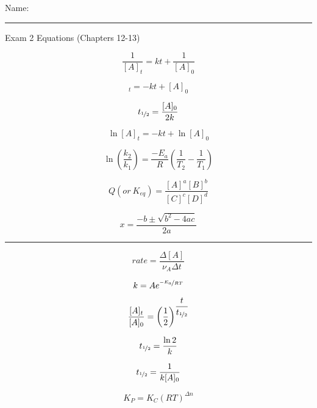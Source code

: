 \documentclass[11pt, letterpaper]{memoir}
\begin{document}
  {\large Name: \rule[-1mm]{4in}{.1pt}}

	\begin{center}
		{\large Exam 2 Equations (Chapters 12-13)}
	\end{center}

  \begin{minipage}[c][\stretch{1}][c]{0.46\linewidth}
    \begin{equation*}
      \dfrac{1}{[A]_t} = kt + \dfrac{1}{[A]_0}
    \end{equation*}

    \begin{equation*}
      [A]_t=-kt+[A]_0
    \end{equation*}

    \begin{equation*}
      t_{\nicefrac{1}{2}} = \dfrac{[A]_0}{2k}
    \end{equation*}

    \begin{equation*}
      \ln[A]_t=-kt+\ln[A]_0
    \end{equation*}

    \begin{equation*}
      \ln\left(\dfrac{k_2}{k_1}\right)=\dfrac{-E_a}{R}\left(\dfrac{1}{T_2}-\dfrac{1}{T_1}\right)
    \end{equation*}

    \begin{equation*}
      Q \left(or~K_{eq}\right) = \dfrac{[A]^a[B]^b}{[C]^c[D]^d}
    \end{equation*}

    \begin{equation*}
      x=\dfrac{-b\pm\sqrt{b^2-4ac}}{2a}
    \end{equation*}
  \end{minipage}
  \rule[-400pt]{1.5pt}{600pt}
  \begin{minipage}[c][\stretch{1}][c]{0.5\linewidth}
    \begin{equation*}
      rate=\dfrac{\Delta[A]}{\nu_A\Delta t}
    \end{equation*}

    \begin{equation*}
      k=Ae^{\nicefrac{-E_a}{RT}}
    \end{equation*}

    \begin{equation*}
      \dfrac{[A]_t}{[A]_0}=\left(\dfrac{1}{2}\right)^{\dfrac{t}{t_{\nicefrac{1}{2}}}}
    \end{equation*}

    \begin{equation*}
      t_{\nicefrac{1}{2}}=\dfrac{\ln{2}}{k}
    \end{equation*}

    \begin{equation*}
      t_{\nicefrac{1}{2}} = \dfrac{1}{k[A]_0}
    \end{equation*}

    \begin{equation*}
      K_P=K_C\left(RT\right)^{\Delta n}
    \end{equation*}
  \end{minipage}
\end{document}
